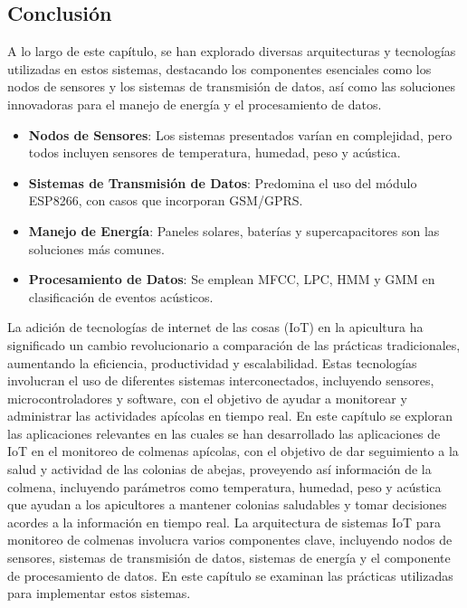 \subsection{Conclusión}
A lo largo de este capítulo, se han explorado diversas arquitecturas y tecnologías utilizadas en estos sistemas, destacando los componentes esenciales como los nodos de sensores y los sistemas de transmisión de datos, así como las soluciones innovadoras para el manejo de energía y el procesamiento de datos.
\begin{itemize}
    \item \textbf{Nodos de Sensores}: Los sistemas presentados varían en complejidad, pero todos incluyen sensores de temperatura, humedad, peso y acústica.
    \item \textbf{Sistemas de Transmisión de Datos}: Predomina el uso del módulo ESP8266, con casos que incorporan GSM/GPRS.
    \item \textbf{Manejo de Energía}: Paneles solares, baterías y supercapacitores son las soluciones más comunes.
    \item \textbf{Procesamiento de Datos}: Se emplean MFCC, LPC, HMM y GMM en clasificación de eventos acústicos.
\end{itemize}
La adición de tecnologías de internet de las cosas (IoT) en la apicultura ha significado un cambio revolucionario a comparación de las prácticas tradicionales, aumentando la eficiencia, productividad y escalabilidad. Estas tecnologías involucran el uso de diferentes sistemas interconectados, incluyendo sensores, microcontroladores y software, con el objetivo de ayudar a monitorear y administrar las actividades apícolas en tiempo real.
En este capítulo se exploran las aplicaciones relevantes en las cuales se han desarrollado las aplicaciones de IoT en el monitoreo de colmenas apícolas, con el objetivo de dar seguimiento a la salud y actividad de las colonias de abejas, proveyendo así información de la colmena, incluyendo parámetros como temperatura, humedad, peso y acústica que ayudan a los apicultores a mantener colonias saludables y tomar decisiones acordes a la información en tiempo real.
La arquitectura de sistemas IoT para monitoreo de colmenas involucra varios componentes clave, incluyendo nodos de sensores, sistemas de transmisión de datos, sistemas de energía y el componente de procesamiento de datos. En este capítulo se examinan las prácticas utilizadas para implementar estos sistemas.

